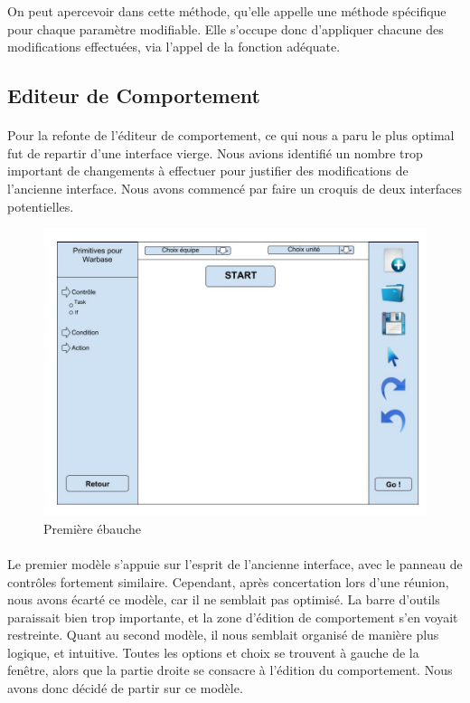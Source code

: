 \documentclass{report}
\begin{document}
On peut apercevoir dans cette méthode, qu'elle appelle une méthode spécifique pour chaque paramètre modifiable.
Elle s'occupe donc d'appliquer chacune des modifications effectuées, via l'appel de la fonction adéquate.




\subsection{Editeur de Comportement}
\paragraph{}
Pour la refonte de l'éditeur de comportement, ce qui nous a paru le plus optimal fut de repartir d'une interface vierge. Nous avions identifié un nombre trop important de changements à effectuer pour justifier des modifications de l'ancienne interface.
Nous avons commencé par faire un croquis de deux interfaces potentielles.
\begin{figure}[!h]
	\centering
		\includegraphics[scale=0.35]{ConceptionGraphique1}
	\caption{Première ébauche}
\end{figure}


\paragraph{}
Le premier modèle s'appuie sur l'esprit de l'ancienne interface, avec le panneau de contrôles fortement similaire. Cependant, après concertation lors d'une réunion, nous avons écarté ce modèle, car il ne semblait pas optimisé. La barre d'outils paraissait bien trop importante, et la zone d'édition de comportement s'en voyait restreinte.\newline
Quant au second modèle, il nous semblait organisé de manière plus logique, et intuitive. Toutes les options et choix se trouvent à gauche de la fenêtre, alors que la partie droite se consacre à l'édition du comportement.\newline
Nous avons donc décidé de partir sur ce modèle.
\end{document}
